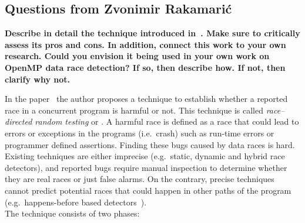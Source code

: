 

\begin{refsection}
\section{Questions from Zvonimir Rakamari\'c}
\label{sec:member2}

\textbf{Describe in detail the technique introduced
  in~\cite{Sen:2008:RDR:1375581.1375584}.
  Make sure to critically assess its pros and cons.
  In addition, connect this work to your own research.
  Could you envision it being used in your own work on OpenMP data race
  detection?
  If so, then describe how.
  If not, then clarify why not.}

\vspace{10pt}
\noindent
In the paper~\cite{Sen:2008:RDR:1375581.1375584} the author proposes a
technique to establish whether a reported race in a concurrent program is
harmful or not.
%
This technique is called \emph{race--directed random testing} or \rfuz.
%
A harmful race is defined as a race that could lead to errors or exceptions
in the programs (i.e.\ crash) such as run-time errors or programmer defined
assertions.
%
Finding these bugs caused by data races is hard.
%
Existing techniques are either imprecise (e.g.\ static, dynamic and hybrid
race detectors), and reported bugs require manual inspection to determine
whether they are real races or just false alarms.
%
On the contrary, precise techniques cannot predict potential races that could
happen in other paths of the program (e.g.\ happens-before based
detectors~\cite{Flanagan:2009}).
\\

\noindent
The \rfuz technique consists of two phases:


\end{refsection}
